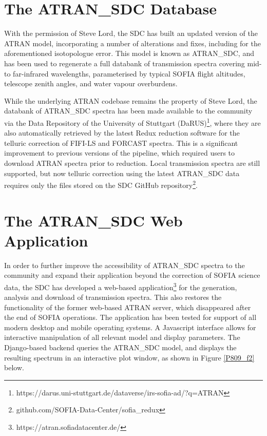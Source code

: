 \documentclass[11pt,twoside]{article}
\begin{document}

\section{The ATRAN\_SDC Database}
With the permission of Steve Lord, the SDC has built an updated version of the ATRAN
model, incorporating a number of alterations and fixes, including for the aforementioned
isotopologue error. This model is known as ATRAN\_SDC, and has been used to regenerate
a full databank of transmission spectra covering mid- to far-infrared wavelengths,
parameterised by typical SOFIA flight altitudes, telescope zenith angles, and water vapour
overburdens.

While the underlying ATRAN codebase remains the property of Steve Lord, the databank of
ATRAN\_SDC spectra has been made available to the community via the Data Repository of the
University of Stuttgart (DaRUS)\footnote{https://darus.uni-stuttgart.de/dataverse/irs-sofia-ad/?q=ATRAN},
where they are also automatically retrieved by the latest Redux reduction software for the
telluric correction of FIFI-LS and FORCAST spectra. This is a significant improvement
to previous versions of the pipeline, which required users to download ATRAN spectra prior
to reduction. Local transmission spectra are still supported, but now telluric correction
using the latest ATRAN\_SDC data requires only the files stored on the SDC GitHub
repository\footnote{github.com/SOFIA-Data-Center/sofia\_redux}.

\section{The ATRAN\_SDC Web Application}
In order to further improve the accessibility of ATRAN\_SDC spectra to the community and
expand their application beyond the correction of SOFIA science data, the SDC has developed
a web-based application\footnote{https://atran.sofiadatacenter.de/} for the generation,
analysis and download of transmission spectra. This also restores the functionality of the
former web-based ATRAN server, which disappeared after the end of SOFIA operations.
The application has been tested for support of all modern desktop and mobile operating systems.
A Javascript interface allows for interactive manipulation of all relevant model and display parameters.
The Django-based backend queries the ATRAN\_SDC model, and displays the resulting spectrum in an interactive
plot window, as shown in Figure \ref{P809_f2} below.
\end{document}
